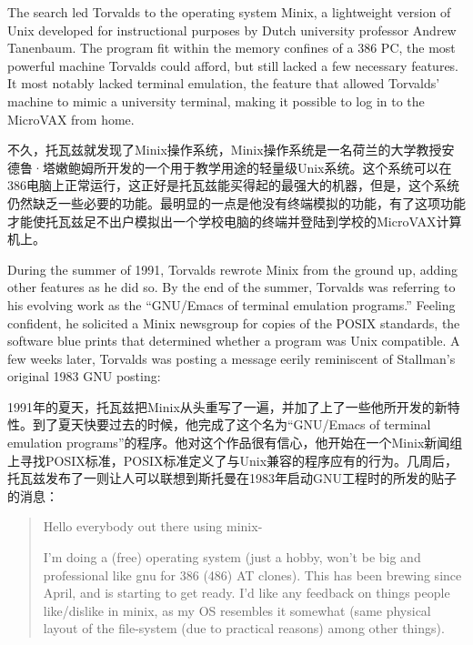 \ifdefined\eng
The search led Torvalds to the operating system Minix, a lightweight version of Unix developed for instructional purposes by Dutch university professor Andrew Tanenbaum. The program fit within the memory confines of a 386 PC, the most powerful machine Torvalds could afford, but still lacked a few necessary features. It most notably lacked terminal emulation, the feature that allowed Torvalds' machine to mimic a university terminal, making it possible to log in to the MicroVAX from home.
\fi

\ifdefined\chs
不久，托瓦兹就发现了Minix操作系统，Minix操作系统是一名荷兰的大学教授安德鲁·塔嫩鲍姆所开发的一个用于教学用途的轻量级Unix系统。这个系统可以在386电脑上正常运行，这正好是托瓦兹能买得起的最强大的机器，但是，这个系统仍然缺乏一些必要的功能。最明显的一点是他没有终端模拟的功能，有了这项功能才能使托瓦兹足不出户模拟出一个学校电脑的终端并登陆到学校的MicroVAX计算机上。
\fi

\ifdefined\eng
During the summer of 1991, Torvalds rewrote Minix from the ground up, adding other features as he did so. By the end of the summer, Torvalds was referring to his evolving work as the ``GNU/Emacs of terminal emulation programs.'' Feeling confident, he solicited a Minix newsgroup for copies of the POSIX standards, the software blue prints that determined whether a program was Unix compatible. A few weeks later, Torvalds was posting a message eerily reminiscent of Stallman's original 1983 GNU posting:
\fi

\ifdefined\chs
1991年的夏天，托瓦兹把Minix从头重写了一遍，并加了上了一些他所开发的新特性。到了夏天快要过去的时候，他完成了这个名为``GNU/Emacs of terminal emulation programs''的程序。他对这个作品很有信心，他开始在一个Minix新闻组上寻找POSIX标准，POSIX标准定义了与Unix兼容的程序应有的行为。几周后，托瓦兹发布了一则让人可以联想到斯托曼在1983年启动GNU工程时的所发的贴子的消息：
\fi

\ifdefined\eng
\begin{quote}
Hello everybody out there using minix-

I'm doing a (free) operating system (just a hobby, won't be big and professional like gnu for 386 (486) AT clones). This has been brewing since April, and is starting to get ready. I'd like any feedback on things people like/dislike in minix, as my OS resembles it somewhat (same physical layout of the file-system (due to practical reasons) among other things). 
\end{quote}
\fi

